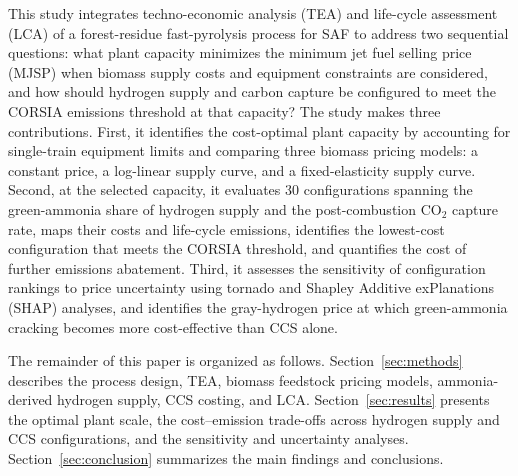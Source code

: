 This study integrates techno-economic analysis (TEA) and life-cycle assessment (LCA) of a forest-residue fast-pyrolysis process for SAF to address two sequential questions: what plant capacity minimizes the minimum jet fuel selling price (MJSP) when biomass supply costs and equipment constraints are considered, and how should hydrogen supply and carbon capture be configured to meet the CORSIA emissions threshold at that capacity? The study makes three contributions. First, it identifies the cost-optimal plant capacity by accounting for single-train equipment limits and comparing three biomass pricing models: a constant price, a log-linear supply curve, and a fixed-elasticity supply curve. Second, at the selected capacity, it evaluates 30 configurations spanning the green-ammonia share of hydrogen supply and the post-combustion CO$_2$ capture rate, maps their costs and life-cycle emissions, identifies the lowest-cost configuration that meets the CORSIA threshold, and quantifies the cost of further emissions abatement. Third, it assesses the sensitivity of configuration rankings to price uncertainty using tornado and Shapley Additive exPlanations (SHAP) analyses, and identifies the gray-hydrogen price at which green-ammonia cracking becomes more cost-effective than CCS alone.

The remainder of this paper is organized as follows. Section~\ref{sec:methods} describes the process design, TEA, biomass feedstock pricing models, ammonia-derived hydrogen supply, CCS costing, and LCA. Section~\ref{sec:results} presents the optimal plant scale, the cost--emission trade-offs across hydrogen supply and CCS configurations, and the sensitivity and uncertainty analyses. Section~\ref{sec:conclusion} summarizes the main findings and conclusions.